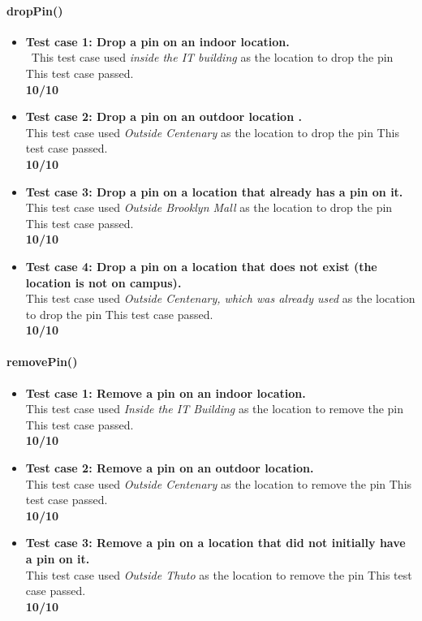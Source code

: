 \documentclass[runningheads,a4paper]{article}
\begin{document}
	\paragraph{dropPin()}
		\begin{itemize}
			\item \textbf{Test case 1: Drop a pin on an indoor location.} \\\
				This test case used \textit{inside the IT building} as the location to drop the pin
				This test case passed.
			\\ \textbf{10/10}
			\item \textbf{Test case 2: Drop a pin on an outdoor location .} \\
				This test case used \textit{Outside Centenary} as the location to drop the pin
				This test case passed.
			\\ \textbf{10/10}
			\item \textbf{Test case 3: Drop a pin on a location that already has a pin on it.} \\
				This test case used \textit{Outside Brooklyn Mall} as the location to drop the pin
				This test case passed.
			\\ \textbf{10/10}
			\item \textbf{Test case 4: Drop a pin on a location that does not exist (the location is not on campus).} \\
				This test case used \textit{Outside Centenary, which was already used} as the location to drop the pin
				This test case passed.
			\\ \textbf{10/10}

		\end{itemize}
	
	\paragraph{removePin()}
		\begin{itemize}
			\item \textbf{Test case 1: Remove a pin on an indoor location.} \\
				This test case used \textit{Inside the IT Building} as the location to remove the pin
				This test case passed.
			\\ \textbf{10/10}
			\item \textbf{Test case 2: Remove a pin on an outdoor location.} \\
				This test case used \textit{Outside Centenary} as the location to remove the pin
				This test case passed.
			\\ \textbf{10/10}
			\item \textbf{Test case 3: Remove a pin on a location that did not initially have a pin on it.} \\
				This test case used \textit{Outside Thuto} as the location to remove the pin
				This test case passed.
			\\ \textbf{10/10}

		\end{itemize}
	
\end{document}
